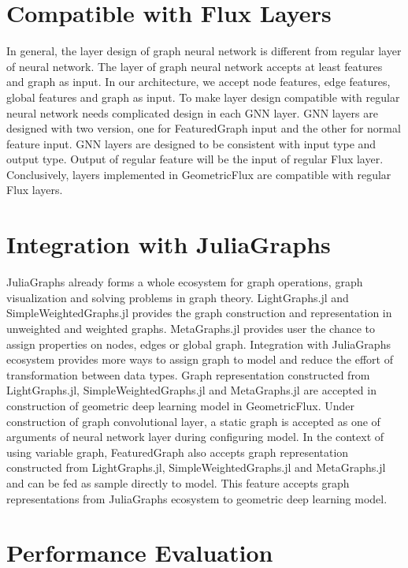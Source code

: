 \documentclass{juliacon}
\begin{document}
\section{Compatible with Flux Layers}

In general, the layer design of graph neural network is different from regular layer of
neural network. The layer of graph neural network accepts at least features and graph as input.
In our architecture, we accept node features, edge features, global features and graph as input.
To make layer design compatible with regular neural network needs complicated design in
each GNN layer. GNN layers are designed with two version, one for FeaturedGraph input and
the other for normal feature input. GNN layers are designed to be consistent with input type
and output type. Output of regular feature will be the input of regular Flux layer.
Conclusively, layers implemented in GeometricFlux are compatible with regular Flux layers.

\section{Integration with JuliaGraphs}

JuliaGraphs already forms a whole ecosystem for graph operations, graph visualization and
solving problems in graph theory. LightGraphs.jl and SimpleWeightedGraphs.jl provides the
graph construction and representation in unweighted and weighted graphs.
MetaGraphs.jl provides user the chance to assign properties on nodes, edges or global graph.
Integration with JuliaGraphs ecosystem provides more ways to assign graph to model and
reduce the effort of transformation between data types. Graph representation constructed
from LightGraphs.jl, SimpleWeightedGraphs.jl and MetaGraphs.jl are accepted in construction
of geometric deep learning model in GeometricFlux. Under construction of graph convolutional
layer, a static graph is accepted as one of arguments of neural network layer during
configuring model. In the context of using variable graph, FeaturedGraph also accepts graph
representation constructed from LightGraphs.jl, SimpleWeightedGraphs.jl and MetaGraphs.jl
and can be fed as sample directly to model. This feature accepts graph representations
from JuliaGraphs ecosystem to geometric deep learning model.

\section{Performance Evaluation}
\end{document}
